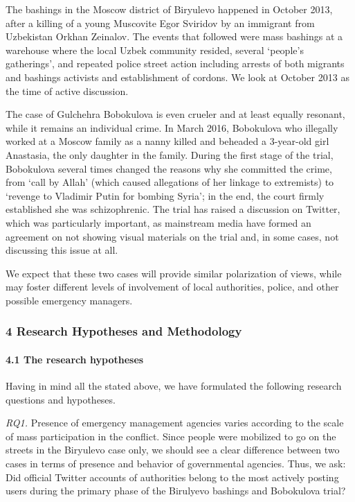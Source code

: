 The bashings in the Moscow district of Biryulevo happened in October 2013, after a killing of a young Muscovite Egor Sviridov by an immigrant from Uzbekistan Orkhan Zeinalov. The events that followed were mass bashings at a warehouse where the local Uzbek community resided, several ‘people’s gatherings’, and repeated police street action including arrests of both migrants and bashings activists and establishment of cordons. We look at October 2013 as the time of active discussion.

The case of Gulchehra Bobokulova is even crueler and at least equally resonant, while it remains an individual crime. In March 2016, Bobokulova who illegally worked at a Moscow family as a nanny killed and beheaded a 3-year-old girl Anastasia, the only daughter in the family. During the first stage of the trial, Bobokulova several times changed the reasons why she committed the crime, from ‘call by Allah’ (which caused allegations of her linkage to extremists) to ‘revenge to Vladimir Putin for bombing Syria’; in the end, the court firmly established she was schizophrenic. The trial has raised a discussion on Twitter, which was particularly important, as mainstream media have formed an agreement on not showing visual materials on the trial and, in some cases, not discussing this issue at all.

We expect that these two cases will provide similar polarization of views, while may foster different levels of involvement of local authorities, police, and other possible emergency managers.

\subsubsection{4 Research Hypotheses and Methodology}

\paragraph{4.1 The research hypotheses}
Having in mind all the stated above, we have formulated the following research questions and hypotheses.

\textit{RQ1.} Presence of emergency management agencies varies according to the scale of mass participation in the conflict. Since people were mobilized to go on the streets in the Biryulevo case only, we should see a clear difference between two cases in terms of presence and behavior of governmental agencies. Thus, we ask: Did official Twitter accounts of authorities belong to the most actively posting users during the primary phase of the Birulyevo bashings and Bobokulova trial?

